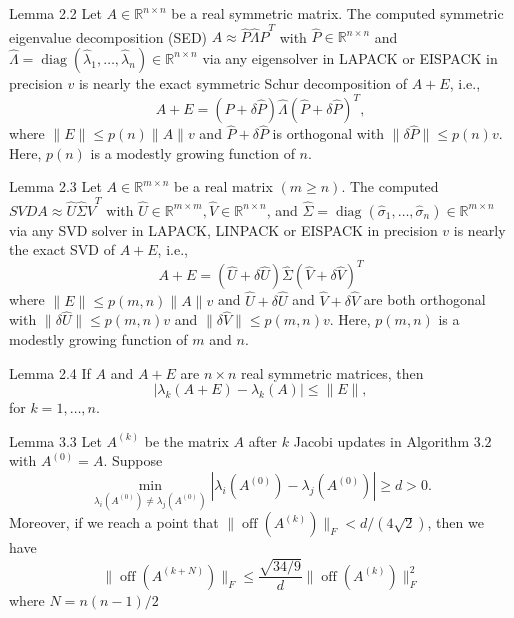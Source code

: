 \documentclass{article}
\begin{document}
\begin{lemma}\label{lemma.2-2}
    Lemma 2.2 Let $A \in \mathbb{R}^{n \times n}$ be a real symmetric
    matrix. The computed symmetric eigenvalue decomposition (SED) $A
    \approx \widehat{P} \widehat{\Lambda} \widehat{P}^T$ with $\widehat{P} \in
    \mathbb{R}^{n \times n}$ and
    $\widehat{\Lambda}=\operatorname{diag}\left(\widehat{\lambda}_1, \ldots,
    \widehat{\lambda}_n\right) \in \mathbb{R}^{n \times n}$ via any
    eigensolver in LAPACK or EISPACK in precision $v$ is nearly the
    exact symmetric Schur decomposition of $A+E$, i.e.,
    $$
        A+E=(\widehat{P}+\delta \widehat{P}) 
        \widehat{\Lambda}(\widehat{P}+\delta \widehat{P})^T,
    $$
    where $\|E\| \leq p(n)\|A\| v$ and $\widehat{P}+\delta \widehat{P}$ is
    orthogonal with $\|\delta \widehat{P}\| \leq p(n) v$. Here, $p(n)$ is a
    modestly growing function of $n$. 
\end{lemma}

\begin{lemma}
    Lemma 2.3 Let $A \in \mathbb{R}^{m \times n}$ be a real matrix $(m
    \geq n)$. The computed $S V D A \approx \widehat{U} \widehat{\Sigma}
    \widehat{V}^T$ with $\widehat{U} \in \mathbb{R}^{m \times m}, \widehat{V} \in
    \mathbb{R}^{n \times n}$, and
    $\widehat{\Sigma}=\operatorname{diag}\left(\widehat{\sigma}_1, \ldots,
    \widehat{\sigma}_n\right) \in \mathbb{R}^{m \times n}$ via any SVD
    solver in LAPACK, LINPACK or EISPACK in precision $v$ is nearly the
    exact SVD of $A+E$, i.e., 
    $$
        A+E=(\widehat{U}+\delta \widehat{U}) \widehat{\Sigma}(\widehat{V}+\delta \widehat{V})^T
    $$
    where $\|E\| \leq p(m, n)\|A\| v$ and $\widehat{U}+\delta \widehat{U}$ and
    $\widehat{V}+\delta \widehat{V}$ are both orthogonal with $\|\delta
    \widehat{U}\| \leq p(m, n) v$ and $\|\delta \widehat{V}\| \leq p(m, n) v$.
    Here, $p(m, n)$ is a modestly growing function of $m$ and $n$. 
\end{lemma}

\begin{lemma}
    Lemma 2.4 If $A$ and $A+E$ are $n \times n$ real symmetric matrices,
    then 
    $$
     \left|\lambda_k(A+E)-\lambda_k(A)\right| \leq\|E\|,
    $$
    for $k=1, \ldots, n$.
\end{lemma}

\begin{lemma}
    \label{lemma.3-3}
    Lemma 3.3 Let $A^{(k)}$ be the matrix $A$ after $k$ Jacobi updates in Algorithm $3.2$ with $A^{(0)}=A$. Suppose
    $$
    \min _{\lambda_i\left(A^{(0)}\right) \neq \lambda_j\left(A^{(0)}\right)}\left|\lambda_i\left(A^{(0)}\right)-\lambda_j\left(A^{(0)}\right)\right| \geq d>0 .
    $$
    Moreover, if we reach a point that $\|\operatorname{off}\left(A^{(k)}\right)\|_F<d /(4 \sqrt{2})$, then we have
    $$
    \|\operatorname{off}\left(A^{(k+N)}\right)\|_F \leq \frac{\sqrt{34 / 9}}{d}\|\operatorname{off}\left(A^{(k)}\right)\|_F^2
    $$
    where $N=n(n-1) / 2$
\end{lemma}
\end{document}
